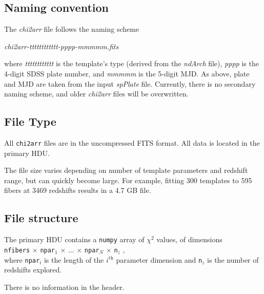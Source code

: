 \documentclass[12pt]{article}
\begin{document}
\subsection{Naming convention}

The \textit{chi2arr} file follows the naming scheme

\hspace*{36pt}\textit{chi2arr-tttttttttttt-pppp-mmmmm.fits}

where \textit{tttttttttttt} is the template's type (derived from the \textit{ndArch} file),
\textit{pppp} is the 4-digit SDSS plate number, and \textit{mmmmm} is the 5-digit
MJD.  As above, plate and MJD are taken from the input \textit{spPlate} file.
Currently, there is no secondary naming scheme, and older \textit{chi2arr} files
will be overwritten.

\subsection{File Type}

All \texttt{chi2arr} files are in the uncompressed FITS format.  All data is located in the
primary HDU.

The file size varies depending on number of template parameters and redshift range,
but can quickly become large.  For example, fitting 300 templates to 595 fibers at
3469 redshifts results in a 4.7 GB file.

\subsection{File structure}

The primary HDU contains a \texttt{numpy} array of $\chi^2$ values, of dimensions \\
\texttt{nfibers} $\times$
\texttt{npar$_1$} $\times$ ... $\times$ \texttt{npar$_N$} $\times$ \texttt{n$_z$} ,\\
where \texttt{npar$_i$} is the length of the $i^{\mathrm{th}}$ parameter dimension
and \texttt{n$_z$} is the number of redshifts explored.

There is no information in the header.
\end{document}
